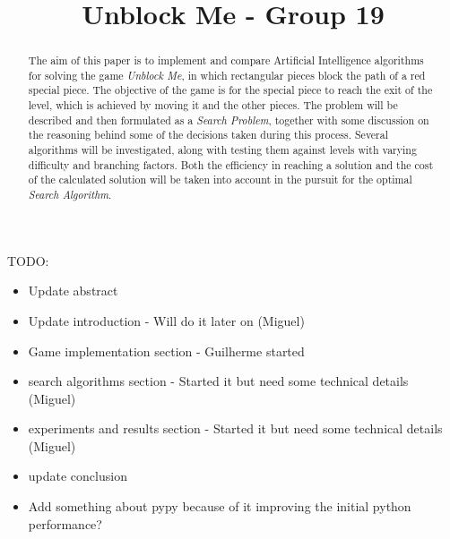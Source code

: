 \documentclass[conference]{IEEEtran}
\begin{document}
\title{Unblock Me - Group 19}

\author{
\and
{}
\and
{}
}

\maketitle

TODO:
\begin{itemize}
    \item Update abstract
    \item Update introduction - Will do it later on (Miguel)
    \item Game implementation section - Guilherme started
    \item search algorithms section - Started it but need some technical details (Miguel)
    \item experiments and results section - Started it but need some technical details (Miguel)
    \item update conclusion
    \item Add something about pypy because of it improving the initial python performance?
\end{itemize}


\begin{abstract}
The aim of this paper is to implement and compare Artificial Intelligence algorithms for solving the game \textit{Unblock Me}, in which rectangular pieces block the path of a red special piece. The objective of the game is for the special piece to reach the exit of the level, which is achieved by moving it and the other pieces.
The problem will be described and then formulated as a \textit{Search Problem}, together with some discussion on the reasoning behind some of the decisions taken during this process.
Several algorithms will be investigated, along with testing them against levels with varying difficulty and branching factors. Both the efficiency in reaching a solution and the cost of the calculated solution will be taken into account in the pursuit for the optimal \textit{Search Algorithm}.
\end{abstract}
\end{document}
